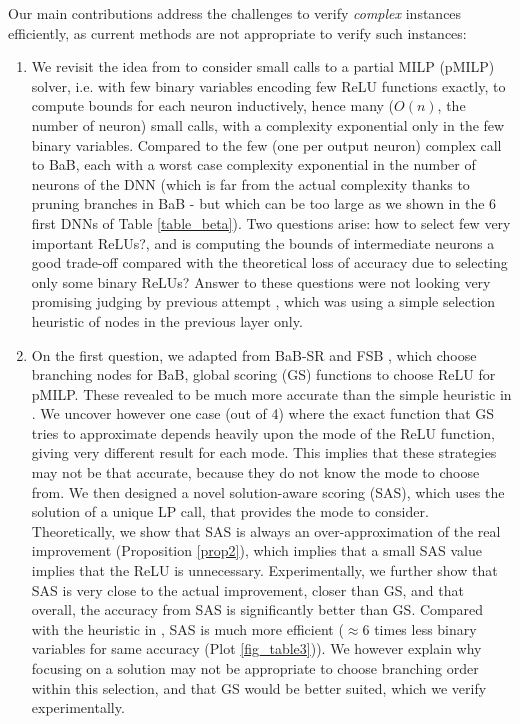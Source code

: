 Our main contributions address the challenges to verify {\em complex} instances efficiently, as current methods are not appropriate to verify such instances:
\begin{enumerate}
	
	\item We revisit the idea from \cite{DivideAndSlide} to consider small calls to a partial MILP (pMILP) solver, i.e. with few binary variables encoding few ReLU functions exactly, to compute bounds for each neuron inductively, hence many ($O(n)$, the number of neuron) small calls, with a complexity exponential only in the few binary variables. Compared to the few (one per output neuron) complex call to BaB, each with a worst case complexity exponential in the number of neurons of the DNN (which is far from the actual complexity thanks to pruning branches in BaB - but which can be too large as we shown in the 6 first DNNs of Table \ref{table_beta}). Two questions arise: how to select few very important ReLUs?, and is computing the bounds of intermediate neurons a good trade-off compared with the theoretical loss of accuracy due to selecting only some binary ReLUs? Answer to these questions were not looking very promising judging by previous attempt \cite{DivideAndSlide}, which was using a simple selection heuristic of nodes in the previous layer only.

	\item On the first question, we adapted from BaB-SR \cite{BaB} and FSB \cite{FSB}, which choose branching nodes for BaB, global scoring (GS) functions to choose ReLU for pMILP. 
	These revealed to be much more accurate than the simple heuristic in 
	\cite{DivideAndSlide}. We uncover however one case (out of 4) where the exact function that GS tries to approximate depends heavily upon the mode of the ReLU function, giving very different result for each mode. This implies that these strategies may not be that accurate, because they do not know the mode to choose from. We then designed a novel solution-aware scoring (SAS), which uses the solution of a unique LP call, that provides the mode to consider. Theoretically, we show that SAS is always an over-approximation of the real improvement (Proposition \ref{prop2}), which implies that a small SAS value implies that the ReLU is unnecessary. Experimentally, we further show that SAS is very close to the actual improvement, closer than GS, and that overall, the accuracy from SAS is significantly better than GS.  Compared with the heuristic in \cite{DivideAndSlide},  SAS is much more efficient ($\approx 6$ times less binary variables for same accuracy (Plot \ref{fig_table3})). We however explain why focusing on a solution may not be appropriate to choose branching order within this selection, and that GS would be better suited, which we verify experimentally.


\end{enumerate}
